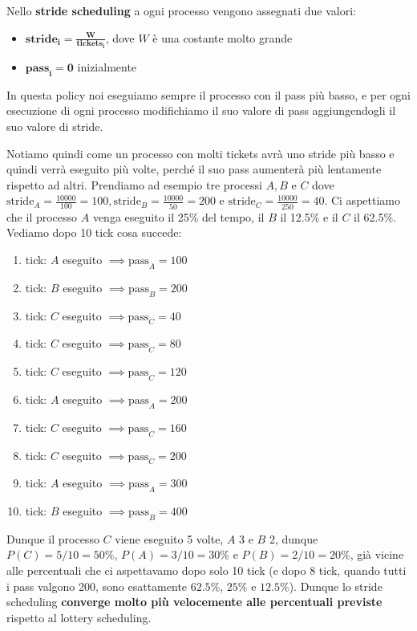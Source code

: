 \documentclass[11pt, a4paper, titlepage, oneside]{scrbook}
\begin{document}
Nello \textbf{stride scheduling} a ogni processo vengono assegnati due valori: 
\begin{itemize}
    \item $\textbf{stride}_{\bm{i}} \bm{= \frac{W}{\textbf{tickets}_i}}$, dove $W$ è una costante molto grande
    \item $\textbf{pass}_{\bm{i}} \bm{= 0}$ inizialmente
\end{itemize}

In questa policy noi eseguiamo sempre il processo con il pass più basso, e per ogni esecuzione di ogni processo modifichiamo il suo valore di pass aggiungendogli il suo valore di stride. 

Notiamo quindi come un processo con molti tickets avrà uno stride più basso e quindi verrà eseguito più volte, perché il suo pass aumenterà più lentamente rispetto ad altri. Prendiamo ad esempio tre processi $A, B$ e $C$ dove $\text{stride}_A = \frac{10000}{100} = 100, \text{stride}_B = \frac{10000}{50} = 200$ e $\text{stride}_C = \frac{10000}{250} = 40$. Ci aspettiamo che il processo $A$ venga eseguito il 25\% del tempo, il $B$ il 12.5\% e il $C$ il 62.5\%. Vediamo dopo 10 tick cosa succede:
\begin{enumerate}[label=\arabic*°]
    \item tick: $A$ eseguito $\implies \text{pass}_A = 100$
    \item tick: $B$ eseguito $\implies \text{pass}_B = 200$
    \item tick: $C$ eseguito $\implies \text{pass}_C = 40$
    \item tick: $C$ eseguito $\implies \text{pass}_C = 80$
    \item tick: $C$ eseguito $\implies \text{pass}_C = 120$
    \item tick: $A$ eseguito $\implies \text{pass}_A = 200$
    \item tick: $C$ eseguito $\implies \text{pass}_C = 160$
    \item tick: $C$ eseguito $\implies \text{pass}_C = 200$
    \item tick: $A$ eseguito $\implies \text{pass}_A = 300$
    \item tick: $B$ eseguito $\implies \text{pass}_B = 400$
\end{enumerate} 

Dunque il processo $C$ viene eseguito 5 volte, $A$ 3 e $B$ 2, dunque $P(C) = 5/10 = 50\%$, $P(A) = 3/10 = 30\%$ e $P(B) = 2/10 = 20\%$, già vicine alle percentuali che ci aspettavamo dopo solo 10 tick (e dopo 8 tick, quando tutti i pass valgono 200, sono esattamente $62.5\%$, $25\%$ e $12.5\%$). Dunque lo stride scheduling \textbf{converge molto più velocemente alle percentuali previste} rispetto al lottery scheduling.
\end{document}
